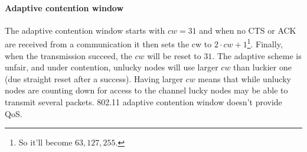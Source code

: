 \paragraph*{Adaptive contention window} The adaptive contention window starts with $cw = 31$ and when no CTS or ACK are received from a communication it then sets the cw to $2 \cdot cw + 1$\footnote{So it'll become $63, 127, 255$.}. Finally, when the transmission succeed, the $cw$ will be reset to $31$.
The adaptive scheme is unfair, and under contention, unlucky nodes will use larger $cw$ than luckier one (due straight reset after a success). Having larger $cw$ means that while unlucky nodes are counting down for access to the channel lucky nodes may be able to transmit several packets. 802.11 adaptive contention window doesn't provide QoS.
